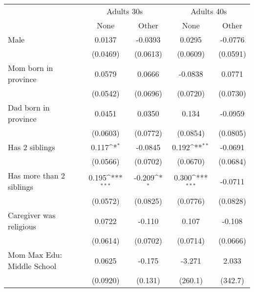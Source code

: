 {
\def\sym#1{\ifmmode^{#1}\else\(^{#1}\)\fi}
\begin{tabular}{l*{4}{c}}
\toprule
					& \multicolumn{2}{c}{Adults 30s} & \multicolumn{2}{c}{Adults 40s} \\
                    &\multicolumn{1}{c}{None}&\multicolumn{1}{c}{Other}&\multicolumn{1}{c}{None}&\multicolumn{1}{c}{Other}\\
\midrule
Male                &      0.0137         &     -0.0393         &      0.0295         &     -0.0776         \\
                    &    (0.0469)         &    (0.0613)         &    (0.0609)         &    (0.0591)         \\
\addlinespace
Mom born in province&      0.0579         &      0.0666         &     -0.0838         &      0.0771         \\
                    &    (0.0542)         &    (0.0696)         &    (0.0720)         &    (0.0730)         \\
\addlinespace
Dad born in province&      0.0451         &      0.0350         &       0.134         &     -0.0959         \\
                    &    (0.0603)         &    (0.0772)         &    (0.0854)         &    (0.0805)         \\
\addlinespace
Has 2 siblings      &       0.117\sym{*}  &     -0.0845         &       0.192\sym{**} &     -0.0691         \\
                    &    (0.0566)         &    (0.0702)         &    (0.0670)         &    (0.0684)         \\
\addlinespace
Has more than 2 siblings&       0.195\sym{***}&      -0.209\sym{*}  &       0.300\sym{***}&     -0.0711         \\
                    &    (0.0572)         &    (0.0825)         &    (0.0776)         &    (0.0828)         \\
\addlinespace
Caregiver was religious&      0.0722         &      -0.110         &       0.107         &      -0.108         \\
                    &    (0.0614)         &    (0.0702)         &    (0.0714)         &    (0.0666)         \\
\addlinespace
Mom Max Edu: Middle School&      0.0625         &      -0.175         &      -3.271         &       2.033         \\
                    &    (0.0920)         &     (0.131)         &     (260.1)         &     (342.7)         \\

\end{tabular}}
